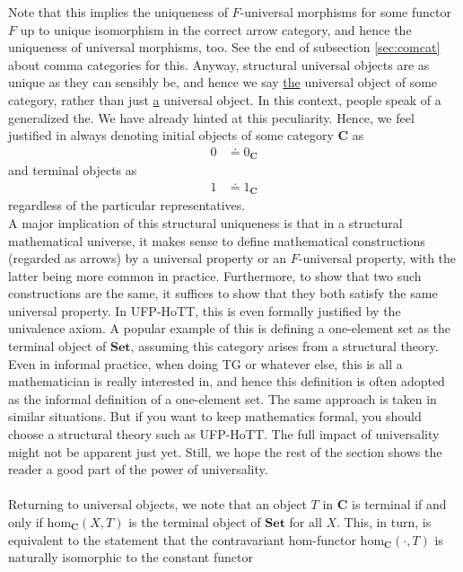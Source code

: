 Note that this implies the uniqueness of $F$-universal morphisms for some functor $F$ up to unique isomorphism in the correct arrow category, and hence the uniqueness of universal morphisms, too.
See the end of subsection \ref{sec:comcat} about comma categories for this.
Anyway, structural universal objects are as unique as they can sensibly be, and hence we say \underline{the} universal object of some category, rather than just \underline{a} universal object.
In this context, people speak of a generalized {\glqq}the{\grqq}.
We have already hinted at this peculiarity.
Hence, we feel justified in always denoting initial objects of some category $\mathbf{C}$ as 
\begin{align*}
  0
  &\doteq
  0_{\mathbf{C}}
\end{align*}
and terminal objects as 
\begin{align*}
  1
  &\doteq
  1_{\mathbf{C}}
\end{align*}
regardless of the particular representatives.
\\
A major implication of this structural uniqueness is that in a structural mathematical universe, it makes sense to define mathematical constructions (regarded as arrows) by a universal property or an $F$-universal property, with the latter being more common in practice.
Furthermore, to show that two such constructions are the same, it suffices to show that they both satisfy the same universal property.
In UFP-HoTT, this is even formally justified by the univalence axiom.
A popular example of this is defining a {\glqq}one-element set{\grqq} as the terminal object of $\mathbf{Set}$, assuming this category arises from a structural theory.
Even in informal practice, when doing TG or whatever else, this is all a mathematician is really interested in, and hence this definition is often adopted as the informal definition of a {\glqq}one-element set{\grqq}.
The same approach is taken in similar situations.
But if you want to keep mathematics formal, you should choose a structural theory such as UFP-HoTT.
The full impact of universality might not be apparent just yet.
Still, we hope the rest of the section shows the reader a good part of the power of universality.
\\\\
Returning to universal objects, we note that an object $T$ in $\mathbf{C}$ is terminal if and only if $\mathrm{hom}_{\mathbf{C}}(X,T)$ is the terminal object of $\mathbf{Set}$ for all $X$.
This, in turn, is equivalent to the statement that the contravariant hom-functor $\mathrm{hom}_{\mathbf{C}}(\cdot,T)$ is naturally isomorphic to the constant functor
